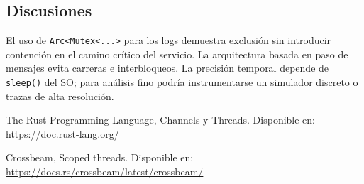 \documentclass[conference]{IEEEtran}
\begin{document}
\subsection{Discusiones}
El uso de \texttt{Arc<Mutex<...>} para los logs demuestra exclusión sin introducir contención en el camino crítico del servicio. La arquitectura basada en paso de mensajes evita carreras e interbloqueos. La precisión temporal depende de \texttt{sleep()} del SO; para análisis fino podría instrumentarse un simulador discreto o trazas de alta resolución.

\begin{thebibliography}{9}

The Rust Programming Language, Channels y Threads. Disponible en: \url{https://doc.rust-lang.org/}

Crossbeam, Scoped threads. Disponible en: \url{https://docs.rs/crossbeam/latest/crossbeam/}

\end{thebibliography}
\end{document}
